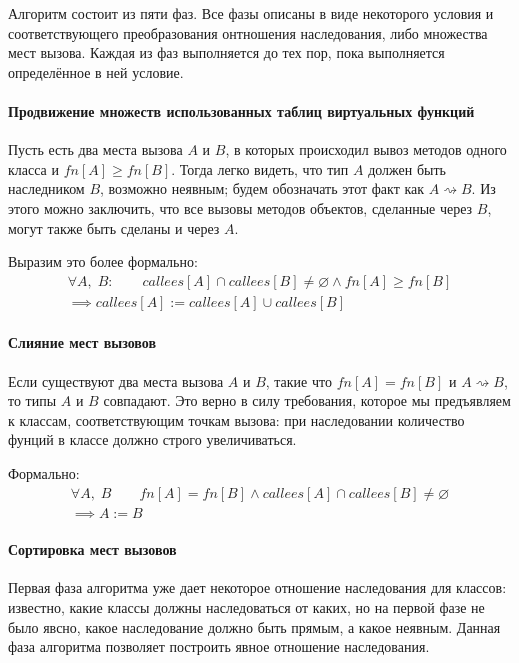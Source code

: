 \documentclass[a4paper,12pt,russian]{article}
\begin{document}
Алгоритм состоит из пяти фаз.
Все фазы описаны в виде некоторого условия и соответствующего преобразования онтношения наследования, либо множества мест вызова.
Каждая из фаз выполняется до тех пор, пока выполняется определённое в ней условие.

\paragraph{Продвижение множеств использованных таблиц виртуальных функций}
Пусть есть два места вызова $A$ и $B$, в которых происходил вывоз методов одного класса и $fn[A] \geq fn[B]$.
Тогда легко видеть, что тип $A$ должен быть наследником $B$, возможно неявным; будем обозначать этот факт как $A \rightsquigarrow B$.
Из этого можно заключить, что все вызовы методов объектов, сделанные через $B$, могут также быть сделаны и через $A$.

Выразим это более формально:
\begin{eqnarray*}
\forall A,\;B:\qquad callees[A] \cap callees[B] \neq \varnothing \wedge fn[A] \geq fn[B]\\
\implies callees[A] := callees[A] \cup callees[B]
\end{eqnarray*}

\paragraph{Слияние мест вызовов}
Если существуют два места вызова $A$ и $B$, такие что $fn[A] = fn[B]$ и $A \rightsquigarrow B$, то типы $A$ и $B$ совпадают.
Это верно в силу требования, которое мы предъявляем к классам, соответствующим точкам вызова: при наследовании количество фунций в классе должно строго увеличиваться.

Формально:
\begin{eqnarray*}
\forall A,\;B\qquad fn[A] = fn[B] \wedge callees[A] \cap callees[B] \neq \varnothing\\
\implies A := B
\end{eqnarray*}

\paragraph{Сортировка мест вызовов}
Первая фаза алгоритма уже дает некоторое отношение наследования для классов: известно, какие классы должны наследоваться от каких, но на первой фазе не было явсно, какое наследование должно быть прямым, а какое неявным. Данная фаза алгоритма позволяет построить явное отношение наследования.
\end{document}
